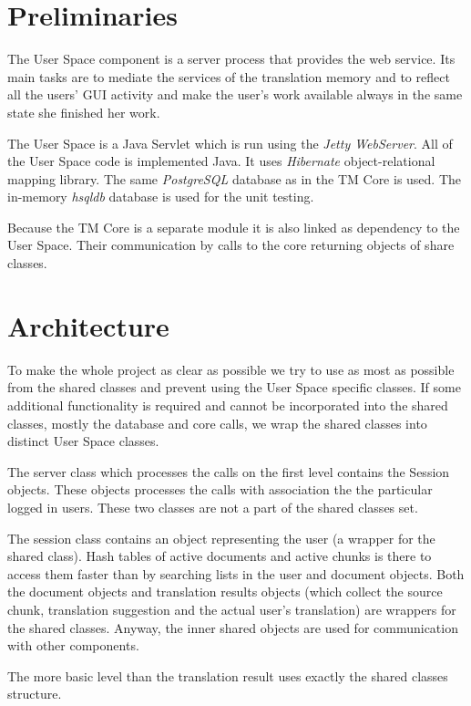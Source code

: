 \section{Preliminaries}

The User Space component is a server process that provides the web service. Its main tasks are to mediate the services of the translation memory and to reflect all the users' GUI activity and make the user's work available always in the same state she finished her work.

The User Space is a Java Servlet which is run using the \emph{Jetty WebServer}. All of the User Space code is implemented Java. It uses \emph{Hibernate} object-relational mapping library. The same \emph{PostgreSQL} database as in the TM Core is used. The in-memory \emph{hsqldb} database is used for the unit testing.

Because the TM Core is a separate module it is also linked as dependency to the User Space. Their communication by calls to the core returning objects of share classes.

\section{Architecture}

To make the whole project as clear as possible we try to use as most as possible from the shared classes and prevent using the User Space specific classes. If some additional functionality is required and cannot be incorporated into the shared classes, mostly the database and core calls, we wrap the shared classes into distinct User Space classes.

The server class which processes the calls on the first level contains the Session objects. These objects processes the calls with association the the particular logged in users. These two classes are not a part of the shared classes set.

The session class contains an object representing the user (a wrapper for the shared class). Hash tables of active documents and active chunks is there to access them faster than by searching lists in the user and document objects. Both the document objects and translation results objects (which collect the source chunk, translation suggestion and the actual user's translation) are wrappers for the shared classes. Anyway, the inner shared objects are used for communication with other components.

The more basic level than the translation result uses exactly the shared classes structure.

